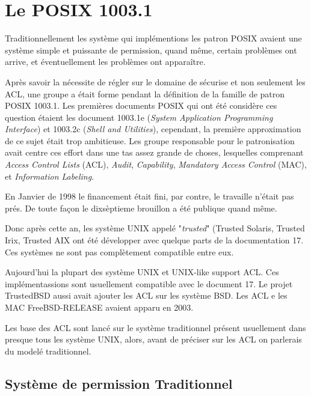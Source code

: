 \section{Le POSIX 1003.1}


Traditionnellement les système qui implémentions les patron POSIX avaient une système simple et puissante de permission, quand même, certain problèmes ont arrive, et éventuellement les problèmes ont apparaître. 

Après savoir la nécessite de régler sur le domaine de sécurise et non seulement les ACL, une groupe a était forme pendant la définition de la famille de patron POSIX 1003.1. Les premières documents POSIX qui ont été considère ces question étaient les document 1003.1e (\emph{System Application Programming Interface}) et 1003.2c (\emph{Shell and Utilities}), cependant, la première approximation de ce sujet était trop ambitieuse. Les groupe responsable pour le patronisation avait centre ces effort dans une tas assez grande de choses, lesquelles  comprenant \emph{Access Control Lists} (ACL), \emph{Audit}, \emph{Capability},\emph{ Mandatory Access Control }(MAC), et \emph{Information Labeling}\cite{aclsuse}.

En Janvier de 1998\cite{aclsuse} le financement était fini, par contre, le travaille n'était pas prés. De toute façon le dixsèptieme brouillon a été publique quand même\cite{posix17}.

Donc après cette an, les système UNIX appelé "\emph{trusted}" (Trusted Solaris, Trusted Irix, Trusted AIX ont été développer avec quelque parts de la documentation 17. Ces systèmes ne sont pas complètement compatible entre eux. 

Aujourd'hui la plupart des système UNIX et UNIX-like support ACL. Ces implémentassions sont usuellement compatible avec le document 17. Le projet TrustedBSD aussi avait ajouter les ACL sur les système BSD. Les ACL e les MAC  FreeBSD-RELEASE avaient apparu en 2003.

Les base des ACL sont lancé sur le système traditionnel présent usuellement dans presque tous les système UNIX, alors, avant de préciser sur les ACL on parlerais du modelé traditionnel.

\subsection*{Système de permission Traditionnel}

